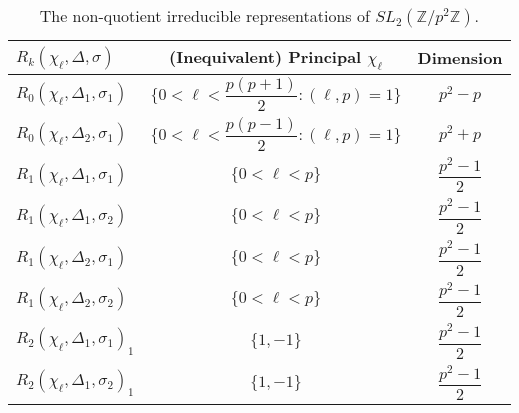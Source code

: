 \documentclass[12pt,reqno]{amsart}
\theoremstyle{remark}
\numberwithin{table}{section}
\newcommand{\Z}{\mathbb Z}
\renewcommand{\arraystretch}{1.5}
\begin{document}
\begin{center}
\def\arraystretch{2.5}
\begin{table}[!htbp]
\begin{tabular}{| l | c |  c |}
\hline
$R_k(\chi_\ell, \Delta, \sigma)$ & (Inequivalent) Principal $\chi_\ell$ &  Dimension \\ \hline \hline
$R_0(\chi_\ell, \Delta_1, \sigma_1)$& $\{0<\ell<\dfrac{p(p+1)}{2}: (\ell,p)=1\}$ & $p^2-p$\\
\hline
$R_0(\chi_\ell, \Delta_2, \sigma_1)$& $\{0<\ell<\dfrac{p(p-1)}{2}: (\ell,p)=1\}$ &  $p^2+p$\\
\hline
$R_1(\chi_\ell, \Delta_1, \sigma_1)$& $\{0<\ell<p\}$ &  $\dfrac{p^2-1}{2}$\\
\hline
$R_1(\chi_\ell, \Delta_1, \sigma_2)$& $\{0<\ell<p\}$ &  $\dfrac{p^2-1}{2}$\\
\hline
$R_1(\chi_\ell, \Delta_2, \sigma_1)$& $\{0<\ell<p\}$ &  $\dfrac{p^2-1}{2}$\\
\hline
$R_1(\chi_\ell, \Delta_2, \sigma_2)$&$\{0<\ell<p\}$ &  $\dfrac{p^2-1}{2}$\\
\hline
$R_2(\chi_\ell,\Delta_1,\sigma_1)_1$&$ \{1, -1\}$&$\dfrac{p^2-1}{2}$\\
\hline
$R_2(\chi_\ell,\Delta_1,\sigma_2)_1$&$ \{1, -1\}$&$\dfrac{p^2-1}{2}$\\
\hline
\end{tabular}
\caption{The non-quotient irreducible representations of $SL_2(\Z/p^2\Z)$.}
\end{table}\label{tbl:p2reps}
\end{center}


\end{document}
